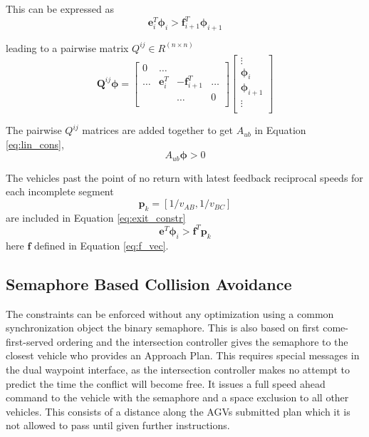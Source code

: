 This can be expressed as 
\begin{equation}
\bm{e}_i^T\bm{\phi}_i > \bm{f}_{i+1}^T\bm{\phi}_{i+1}
\end{equation}

leading to a pairwise matrix $Q^{ij} \in R^{(n \times n)}$
\begin{equation}
\bm{Q}^{ij}\bm{\phi} = \left[ \begin{array}{cccc}
0 & \hdots &&\\
\hdots & \bm{e}_i^T & -\bm{f}_{i+1}^T & \hdots \\
&&\hdots & 0\\
\end{array} \right]
\left[ \begin{array}{c}
\vdots\\
\bm{\phi}_i \\
\bm{\phi}_{i+1} \\
\vdots\\
\end{array} \right]
\end{equation}

The pairwise $Q^{ij}$ matrices are added together to get $A_{ub}$ in Equation \ref{eq:lin_cons}, 
\begin{equation}
\label{eq:lin_cons}
A_{ub}\bm{\phi} > 0
\end{equation}

The vehicles past the point of no return with latest feedback reciprocal speeds for each incomplete segment
\begin{equation}
\bm{p}_k  = [1/v_{AB}, 1/v_{BC}]
\end{equation}
are included in Equation \ref{eq:exit_constr} 
\begin{equation}
\bm{e}^T\bm{\phi}_i >  \bm{f}^T\bm{p}_k
\label{eq:exit_constr}
\end{equation} 
here $\bm{f}$ defined in Equation \ref{eq:f_vec}.
 
  
\subsection{Semaphore Based Collision Avoidance}
The constraints can be enforced without any optimization using a common synchronization object the binary semaphore. This is also based on first come-first-served ordering and the intersection controller gives the semaphore to the closest vehicle who provides an Approach Plan. This requires special messages in the dual waypoint interface, as the intersection controller makes no attempt to predict the time the conflict will become free. It issues a full speed ahead command to the vehicle with the semaphore and a space exclusion to all other vehicles. This consists of a distance along the AGVs submitted plan which it is not allowed to pass until given further instructions. 

